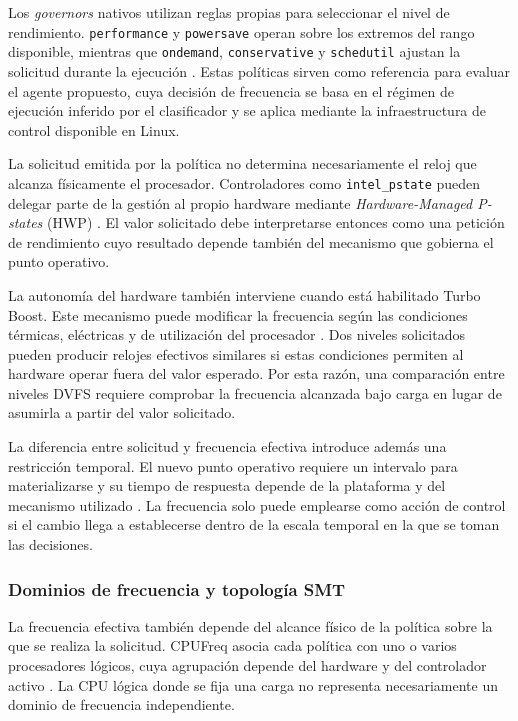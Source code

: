Los \textit{governors} nativos utilizan reglas propias para seleccionar el
nivel de rendimiento. \texttt{performance} y \texttt{powersave} operan sobre
los extremos del rango disponible, mientras que \texttt{ondemand},
\texttt{conservative} y \texttt{schedutil} ajustan la solicitud durante la
ejecución \cite{Hebbar2022,LinuxCPUFreq2026}. Estas políticas sirven como
referencia para evaluar el agente propuesto, cuya decisión de frecuencia se
basa en el régimen de ejecución inferido por el clasificador y se aplica
mediante la infraestructura de control disponible en Linux.

La solicitud emitida por la política no determina necesariamente el reloj que
alcanza físicamente el procesador. Controladores como
\texttt{intel\_pstate} pueden delegar parte de la gestión al propio hardware
mediante \textit{Hardware-Managed P-states} (HWP)
\cite{LinuxIntelPstate2026,Hebbar2022}. El valor solicitado debe interpretarse
entonces como una petición de rendimiento cuyo resultado depende también del
mecanismo que gobierna el punto operativo.

La autonomía del hardware también interviene cuando está habilitado Turbo
Boost. Este mecanismo puede modificar la frecuencia según las condiciones
térmicas, eléctricas y de utilización del procesador
\cite{LinuxIntelPstate2026,Hebbar2022}. Dos niveles solicitados pueden producir
relojes efectivos similares si estas condiciones permiten al hardware operar
fuera del valor esperado. Por esta razón, una comparación entre niveles DVFS
requiere comprobar la frecuencia alcanzada bajo carga en lugar de asumirla a
partir del valor solicitado.

La diferencia entre solicitud y frecuencia efectiva introduce además una
restricción temporal. El nuevo punto operativo requiere un intervalo para
materializarse y su tiempo de respuesta depende de la plataforma y del
mecanismo utilizado \cite{Hebbar2022}. La frecuencia solo puede emplearse como
acción de control si el cambio llega a establecerse dentro de la escala
temporal en la que se toman las decisiones.

\subsubsection{Dominios de frecuencia y topología SMT}
\label{sec:dominios}

La frecuencia efectiva también depende del alcance físico de la política sobre
la que se realiza la solicitud. CPUFreq asocia cada política con uno o varios
procesadores lógicos, cuya agrupación depende del hardware y del controlador
activo \cite{LinuxCPUFreq2026}. La CPU lógica donde se fija una carga no
representa necesariamente un dominio de frecuencia independiente.

